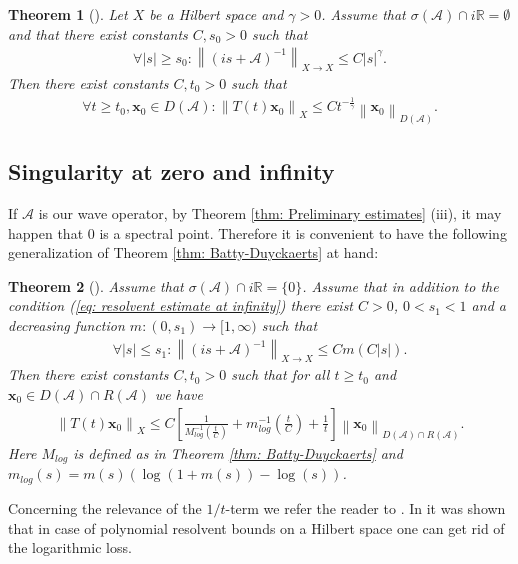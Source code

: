 \documentclass{amsart}
\newcommand{\abs}[1]{\left|#1\right|}
\newcommand{\norm}[1]{\left\| #1 \right\|}
\newcommand{\A}{\mathcal{A}}
\newcommand{\xnice}{\mathbf{x}}
\newcommand{\R}{\mathbb{R}}
\newtheorem{Theorem}{Theorem}
\begin{document}
\begin{appendix}
\begin{Theorem}[\cite{BorichevTomilov2010}]\label{thm: Borichev-Tomilov}
 Let $X$ be a Hilbert space and $\gamma>0$. Assume that $\sigma(\A)\cap i\R=\emptyset$ and that there exist constants $C, s_0 > 0$ such that 
 \begin{align*}%
  \forall \abs{s}\geq s_0: \norm{(is+\A)^{-1}}_{X\rightarrow X} \leq C \abs{s}^{\gamma}.
 \end{align*}
 Then there exist constants $C,t_0 > 0$ such that
 \begin{align*}
  \forall t\geq t_0, \xnice_0\in D(\A): \norm{T(t)\xnice_0}_{X} \leq C t^{-\frac{1}{\gamma}}\norm{\xnice_0}_{D(\A)}.
 \end{align*}
\end{Theorem}

\subsection{Singularity at zero and infinity}
If $\A$ is our wave operator, by Theorem \ref{thm: Preliminary estimates} (iii), it may happen that $0$ is a spectral point. Therefore it is convenient to have the following generalization of Theorem \ref{thm: Batty-Duyckaerts} at hand:
\begin{Theorem}[\cite{Martinez2011}]\label{thm: Martinez}
 Assume that $\sigma(\A)\cap i\R=\{0\}$. Assume that in addition to the condition (\ref{eq: resolvent estimate at infinity}) there exist $C > 0$, $0<s_1<1$ and a decreasing function $m:(0,s_1)\rightarrow[1,\infty)$ such that 
 \begin{align*}%
  \forall \abs{s}\leq s_1: \norm{(is+\A)^{-1}}_{X\rightarrow X} \leq C m(C\abs{s}).
 \end{align*}
 Then there exist constants $C,t_0 > 0$ such that for all $t\geq t_0$ and $\xnice_0\in D(\A)\cap R(\A)$ we have 
 \begin{align*}
  \norm{T(t)\xnice_0}_{X} \leq C\left[\frac{1}{M_{log}^{-1}(\frac{t}{C})} + m_{log}^{-1}(\frac{t}{C}) + \frac{1}{t}\right]\norm{\xnice_0}_{D(\A)\cap R(\A)}.
 \end{align*}
 Here $M_{log}$ is defined as in Theorem \ref{thm: Batty-Duyckaerts} and $m_{log}(s) = m(s)(\log(1+m(s))-\log(s))$.
\end{Theorem}
Concerning the relevance of the $1/t$-term we refer the reader to \cite[Section 8]{BattyChillTomilov2016}. In \cite[Theorem 8.4]{BattyChillTomilov2016} it was shown that in case of polynomial resolvent bounds on a Hilbert space one can get rid of the logarithmic loss.
\end{appendix}
\end{document}
